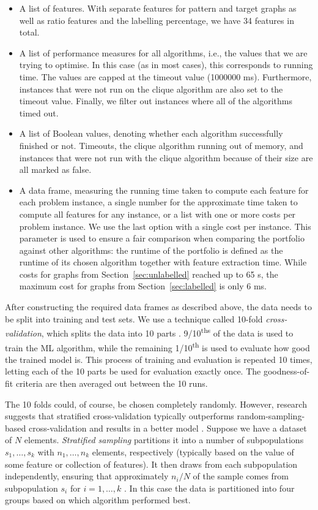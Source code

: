 \documentclass{l4proj}
\theoremstyle{definition}
\theoremstyle{remark}
\begin{document}
\begin{itemize}
\item A list of features. With separate features for pattern and target graphs
  as well as ratio features and the labelling percentage, we have 34 features in
  total.
\item A list of performance measures for all algorithms, i.e., the values that
  we are trying to optimise. In this case (as in most cases), this corresponds
  to running time. The values are capped at the timeout value (\num{1000000} ms).
  Furthermore, instances that were not run on the clique algorithm are also set
  to the timeout value. Finally, we filter out instances where all of the
  algorithms timed out.
\item A list of Boolean values, denoting whether each algorithm successfully
  finished or not. Timeouts, the clique algorithm running out of memory, and
  instances that were not run with the clique algorithm because of their size
  are all marked as false.
\item A data frame, measuring the running time taken to compute each feature for
  each problem instance, a single number for the approximate time taken to
  compute all features for any instance, or a list with one or more costs per
  problem instance. We use the last option with a single cost per instance. This
  parameter is used to ensure a fair comparison when comparing the portfolio
  against other algorithms: the runtime of the portfolio is defined as the
  runtime of its chosen algorithm together with feature extraction time.
  While costs for graphs from Section~\ref{sec:unlabelled} reached up to 65 s,
  the maximum cost for graphs from Section~\ref{sec:labelled} is only 6 ms.
\end{itemize}

After constructing the required data frames as described above, the data needs to
be split into training and test sets. We use a technique called 10-fold
\emph{cross-validation}, which splits the data into 10 parts \cite{citeulike:1304145}.
9/10\textsuperscript{ths} of the data is used to train the ML algorithm, while
the remaining 1/10\textsuperscript{th} is used to evaluate how good the trained
model is. This process of training and evaluation is repeated 10 times, letting
each of the 10 parts be used for evaluation exactly once. The goodness-of-fit
criteria are then averaged out between the 10 runs.

The 10 folds could, of course, be chosen completely randomly. However, research
suggests that stratified cross-validation typically outperforms
random-sampling-based cross-validation and results in a better model
\cite{DBLP:conf/ijcai/Kohavi95}. Suppose we have a dataset of $N$ elements.
\emph{Stratified sampling} partitions it into a number of subpopulations $s_1,
\dots, s_k$ with $n_1, \dots, n_k$ elements, respectively (typically based on
the value of some feature or collection of features). It then draws from each
subpopulation independently, ensuring that approximately $n_i/N$ of the sample
comes from subpopulation $s_i$ for $i = 1, \dots, k$ \cite{lohr2009sampling}. In
this case the data is partitioned into four groups based on which algorithm
performed best.
\end{document}
